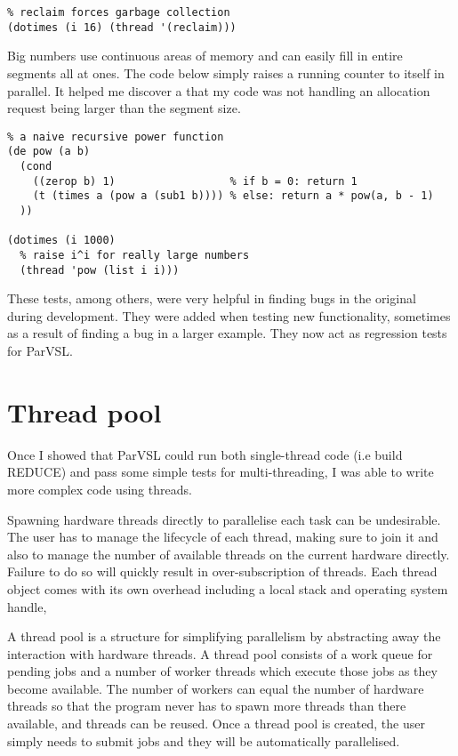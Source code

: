\label{lst:multi-gc}
\begin{verbatim}
% reclaim forces garbage collection
(dotimes (i 16) (thread '(reclaim)))
\end{verbatim}

Big numbers use continuous areas of memory and can easily
fill in entire segments all at ones. The code below simply
raises a running counter to itself in parallel. It helped me discover
a that my code was not handling an allocation request being
larger than the segment size.

\label{lst:number-crunch}
\begin{verbatim}
% a naive recursive power function
(de pow (a b)
  (cond
    ((zerop b) 1)                  % if b = 0: return 1
    (t (times a (pow a (sub1 b)))) % else: return a * pow(a, b - 1)
  ))

(dotimes (i 1000)
  % raise i^i for really large numbers
  (thread 'pow (list i i)))
\end{verbatim}

These tests, among others, were very helpful in finding bugs in the original
during development. They were added when testing new functionality,
sometimes as a result of finding a bug in a larger example.
They now act as regression tests for ParVSL.

\section{Thread pool}

Once I showed  that ParVSL could run both single-thread code (i.e build REDUCE) and pass some
simple tests for multi-threading, I was able to write more complex code using threads.

Spawning hardware threads directly to parallelise each task can be undesirable. The user has
to manage the lifecycle of each thread, making sure to join it and also to manage the number
of available threads on the current hardware directly. Failure to do so will quickly result in
over-subscription of threads. Each thread object comes with its own overhead including a local
stack and operating system handle,

A thread pool is a structure for simplifying parallelism by abstracting away the interaction
with hardware threads. A thread pool consists of a work queue for pending jobs and a number
of worker threads which execute those jobs as they become available. The number of workers
can equal the number of hardware threads so that the program never has to spawn more threads
than there available, and threads can be reused. Once a thread pool is created, the user simply
needs to submit jobs and they will be automatically parallelised.

